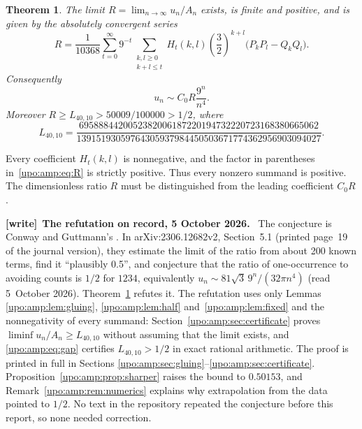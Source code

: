 \documentclass[11pt,letterpaper]{article}
\newtheorem{theorem}{Theorem}[section]
\theoremstyle{remark}\newtheorem{remark}[theorem]{Remark}
\numberwithin{equation}{section}
\newenvironment{writenote}[1][]{\par\smallskip\begingroup\small
 \noindent\textbf{[write]}\if\relax\detokenize{#1}\relax\else~\textbf{#1.}\fi\ }%
 {\par\endgroup\smallskip}
\begin{document}
\begin{theorem}\label{upo:amp:thm:main}
The limit $R=\lim_{n\to\infty}u_n/A_n$ exists, is finite and positive, and is
given by the absolutely convergent series
\begin{equation}\label{upo:amp:eq:R}
R=\frac1{10368}\sum_{t=0}^{\infty}9^{-t}
\sum_{\substack{k,l\ge0\\k+l\le t}}
H_t(k,l)\left(\frac32\right)^{k+l}
\bigl(P_kP_l-Q_kQ_l\bigr).
\end{equation}
Consequently
\begin{equation}\label{upo:amp:eq:main}
u_n\sim C_0R\frac{9^n}{n^4}.
\end{equation}
Moreover $R\ge L_{40,10}>50009/100000>1/2$, where
\begin{equation}\label{upo:amp:eq:certificate}
L_{40,10}=
\frac{6958884420052382006187220194732220723168380665062}
{13915193059764305937984450503671774362956903094027}.
\end{equation}
\end{theorem}

Every coefficient $H_t(k,l)$ is nonnegative, and the factor in parentheses
in~\eqref{upo:amp:eq:R} is strictly positive. Thus every nonzero summand is positive.
The dimensionless ratio $R$ must be distinguished from the leading
coefficient $C_0R$.
\begin{writenote}[The refutation on record, 5 October 2026]
The conjecture is Conway and Guttmann's \cite{CG}. In arXiv:2306.12682v2, Section~5.1 (printed page~19 of the journal version), they estimate the limit of the ratio from about 200 known terms, find it ``plausibly 0.5'', and conjecture that the ratio of one-occurrence to avoiding counts is $1/2$ for $1234$, equivalently $u_n\sim81\sqrt3\,9^n/(32\pi n^4)$ (read 5~October 2026). Theorem~\ref{upo:amp:thm:main} refutes it. The refutation uses only Lemmas \ref{upo:amp:lem:gluing}, \ref{upo:amp:lem:half} and~\ref{upo:amp:lem:fixed} and the nonnegativity of every summand: Section~\ref{upo:amp:sec:certificate} proves $\liminf u_n/A_n\ge L_{40,10}$ without assuming that the limit exists, and \eqref{upo:amp:eq:gap} certifies $L_{40,10}>1/2$ in exact rational arithmetic. The proof is printed in full in Sections \ref{upo:amp:sec:gluing}--\ref{upo:amp:sec:certificate}. Proposition~\ref{upo:amp:prop:sharper} raises the bound to $0.50153$, and Remark~\ref{upo:amp:rem:numerics} explains why extrapolation from the data pointed to $1/2$. No text in the repository repeated the conjecture before this report, so none needed correction.
\end{writenote}
\end{document}
